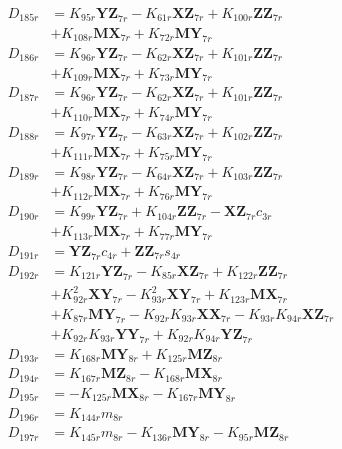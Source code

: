 \begin{multicols}{2}
\begin{align}
D_{185r} &= K_{95r}\mathbf{YZ}_{7r} - K_{61r}\mathbf{XZ}_{7r} + K_{100r}\mathbf{ZZ}_{7r}  \nonumber \\
&+ K_{108r}\mathbf{MX}_{7r} + K_{72r}\mathbf{MY}_{7r} \nonumber \\
D_{186r} &= K_{96r}\mathbf{YZ}_{7r} - K_{62r}\mathbf{XZ}_{7r} + K_{101r}\mathbf{ZZ}_{7r}  \nonumber \\
&+ K_{109r}\mathbf{MX}_{7r} + K_{73r}\mathbf{MY}_{7r} \nonumber \\
D_{187r} &= K_{96r}\mathbf{YZ}_{7r} - K_{62r}\mathbf{XZ}_{7r} + K_{101r}\mathbf{ZZ}_{7r}  \nonumber \\
&+ K_{110r}\mathbf{MX}_{7r} + K_{74r}\mathbf{MY}_{7r} \nonumber \\
D_{188r} &= K_{97r}\mathbf{YZ}_{7r} - K_{63r}\mathbf{XZ}_{7r} + K_{102r}\mathbf{ZZ}_{7r}  \nonumber \\
&+ K_{111r}\mathbf{MX}_{7r} + K_{75r}\mathbf{MY}_{7r} \nonumber \\
D_{189r} &= K_{98r}\mathbf{YZ}_{7r} - K_{64r}\mathbf{XZ}_{7r} + K_{103r}\mathbf{ZZ}_{7r}  \nonumber \\
&+ K_{112r}\mathbf{MX}_{7r} + K_{76r}\mathbf{MY}_{7r} \nonumber \\
D_{190r} &= K_{99r}\mathbf{YZ}_{7r} + K_{104r}\mathbf{ZZ}_{7r} - \mathbf{XZ}_{7r}c_{3r}  \nonumber \\
&+ K_{113r}\mathbf{MX}_{7r} + K_{77r}\mathbf{MY}_{7r} \nonumber \\
D_{191r} &= \mathbf{YZ}_{7r}c_{4r} + \mathbf{ZZ}_{7r}s_{4r} \nonumber \\
D_{192r} &= K_{121r}\mathbf{YZ}_{7r} - K_{85r}\mathbf{XZ}_{7r} + K_{122r}\mathbf{ZZ}_{7r}  \nonumber \\
&+ K_{92r}^2\mathbf{XY}_{7r} - K_{93r}^2\mathbf{XY}_{7r} + K_{123r}\mathbf{MX}_{7r}  \nonumber \\
&+ K_{87r}\mathbf{MY}_{7r} - K_{92r}K_{93r}\mathbf{XX}_{7r} - K_{93r}K_{94r}\mathbf{XZ}_{7r}  \nonumber \\
&+ K_{92r}K_{93r}\mathbf{YY}_{7r} + K_{92r}K_{94r}\mathbf{YZ}_{7r} \nonumber \\
D_{193r} &= K_{168r}\mathbf{MY}_{8r} + K_{125r}\mathbf{MZ}_{8r} \nonumber \\
D_{194r} &= K_{167r}\mathbf{MZ}_{8r} - K_{168r}\mathbf{MX}_{8r} \nonumber \\
D_{195r} &= - K_{125r}\mathbf{MX}_{8r} - K_{167r}\mathbf{MY}_{8r} \nonumber \\
D_{196r} &= K_{144r}m_{8r} \nonumber \\
D_{197r} &= K_{145r}m_{8r} - K_{136r}\mathbf{MY}_{8r} - K_{95r}\mathbf{MZ}_{8r} \nonumber \\

\end{align}
\end{multicols}
